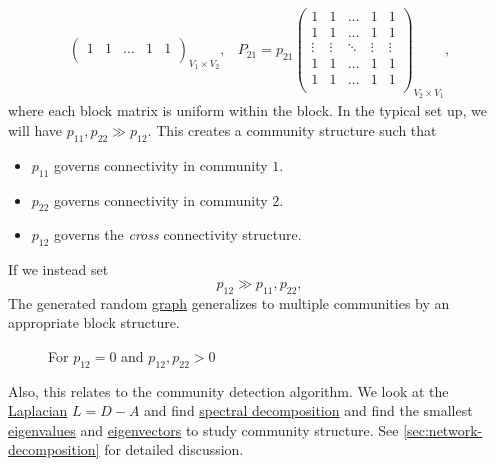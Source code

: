 \begin{eg}
\[\begin{split}
\begin{pmatrix}
				               1      & 1      & \dots  & 1      & 1      \\
			               \end{pmatrix}_{V_1 \times V_2}, &
			P_{21} = p_{21}\begin{pmatrix}
				               1      & 1      & \dots  & 1      & 1      \\
				               1      & 1      & \dots  & 1      & 1      \\
				               \vdots & \vdots & \ddots & \vdots & \vdots \\
				               1      & 1      & \dots  & 1      & 1      \\
				               1      & 1      & \dots  & 1      & 1      \\
			               \end{pmatrix}_{V_2 \times V_1},
		\end{split}
	\]
	where each block matrix is uniform within the block. In the typical set up, we will have \(p_{11}, p_{22} \gg p_{12}\). This creates a community structure such that
	\begin{itemize}
		\item \(p_{11}\) governs connectivity in community \(1\).
		\item \(p_{22}\) governs connectivity in community \(2\).
		\item \(p_{12}\) governs the \emph{cross} connectivity structure.
	\end{itemize}

	\begin{remark}
		If we instead set
		\[
			p_{12}\gg p_{11}, p_{22},
		\]
		The generated random \hyperref[def:graph]{graph} generalizes to multiple communities by an appropriate block structure.

		\begin{figure}[H]
			\centering
			\caption{For \(p_{12}=0\) and \(p_{12}, p_{22}>0\)}
			\label{fig:bipartite-graph-generalization}
		\end{figure}

		Also, this relates to the community detection algorithm. We look at the \hyperref[def:Laplacian]{Laplacian} \(L = D - A\) and find \hyperref[thm:eigen-decomposition]{spectral decomposition} and find the smallest \hyperref[def:eigenvalue]{eigenvalues} and \hyperref[def:eigenvector]{eigenvectors} to study community structure. See \autoref{sec:network-decomposition} for detailed discussion.
	\end{remark}
\end{eg}

